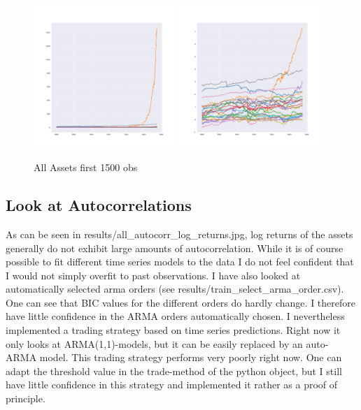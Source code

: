 \begin{figure}[h!]
    \centering
    \includegraphics[width=0.48\textwidth]{../results/train_all_assets.jpg}
    \includegraphics[width=0.48\textwidth]{../results/train_all_assets_logged.jpg}
    \caption{All Assets first 1500 obs}
    \label{1}
  
\end{figure}{}

\subsection{Look at Autocorrelations}
As can be seen in results\slash all\_autocorr\_log\_returns.jpg, log returns of the assets generally do not exhibit large amounts of autocorrelation. While it is of course possible to fit different time series models to the data I do not feel confident that I would not simply overfit to past observations. I have also looked at automatically selected arma orders (see results\slash train\_select\_arma\_order.csv). One can see that BIC values for the different orders do hardly change. I therefore have little confidence in the ARMA orders automatically chosen. I nevertheless implemented a trading strategy based on time series predictions. Right now it only looks at ARMA(1,1)-models, but it can be easily replaced by an auto-ARMA model. This trading strategy performs very poorly right now. One can adapt the threshold value in the trade-method of the python object, but I still have little confidence in this strategy and implemented it rather as a proof of principle. 


